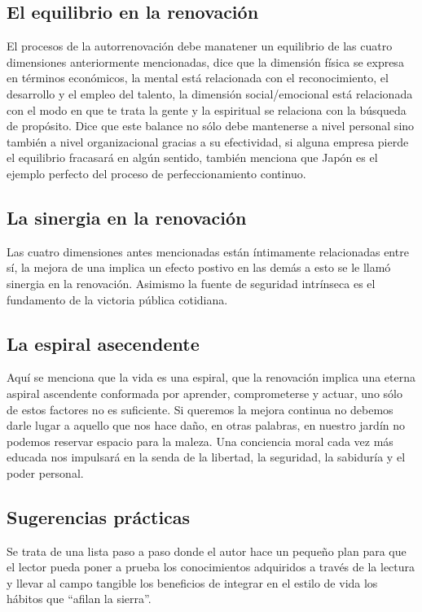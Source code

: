 \documentclass[onecolumn]{article} %
\begin{document}
	\subsection{El equilibrio en la renovación}
	
	El procesos de la autorrenovación debe manatener un equilibrio de las cuatro dimensiones anteriormente mencionadas, dice que la dimensión física se expresa en términos económicos, la mental está relacionada con el reconocimiento, el desarrollo y el empleo del talento, la dimensión social/emocional está relacionada con el modo en que te trata la gente y la espiritual se relaciona con la búsqueda de propósito. Dice que este balance no sólo debe mantenerse a nivel personal sino también a nivel organizacional gracias a su efectividad, si alguna empresa pierde el equilibrio fracasará en algún sentido, también menciona que Japón es el ejemplo perfecto del proceso de perfeccionamiento continuo.
	
	\subsection{La sinergia en la renovación}
	
	Las cuatro dimensiones antes mencionadas están íntimamente relacionadas entre sí, la mejora de una implica un efecto postivo en las demás a esto se le llamó sinergia en la renovación. Asimismo la fuente de seguridad intrínseca es el fundamento de la victoria pública cotidiana. 
	
	\subsection{La espiral asecendente}
	
	Aquí se menciona que la vida es una espiral, que la renovación implica una eterna aspiral ascendente conformada por aprender, comprometerse y actuar, uno sólo de estos factores no es suficiente. Si queremos la mejora continua no debemos darle lugar a aquello que nos hace daño, en otras palabras, en nuestro jardín no podemos reservar espacio para la maleza. Una conciencia moral cada vez más educada nos impulsará en la senda de la libertad, la seguridad, la sabiduría y el poder personal. 
	
	\subsection{Sugerencias prácticas}
	
	Se trata de una lista paso a paso donde el autor hace un pequeño plan para que el lector pueda poner a prueba los conocimientos adquiridos a través de la lectura y llevar al campo tangible los beneficios de integrar en el estilo de vida los hábitos que ``afilan la sierra''.\\
	
\end{document}
